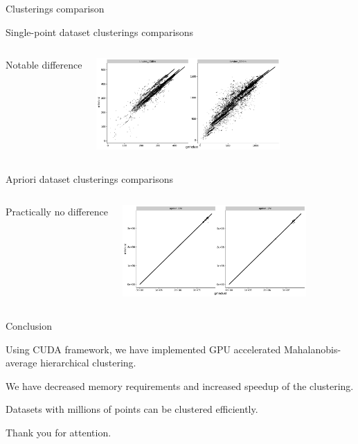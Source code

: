 \documentclass[10pt]{beamer}
\begin{document}
\begin{frame}{Clusterings comparison}
	
	\begin{block}{Single-point dataset clusterings comparisons}
		
		\begin{columns}
			\column{\linewidth-7cm}
			
			Notable difference
			
			\column{7cm}
			\includegraphics[width=7cm]{img/single_result}
			
		\end{columns}
	\end{block}

	\begin{block}{Apriori dataset clusterings comparisons}
		\begin{columns}
			\column{\linewidth-7cm}
			
			
			Practically no difference
			
			\column{7cm}
			\includegraphics[width=7cm]{../img/apriori_result}
			
		\end{columns}
	\end{block}
	
\end{frame}

\begin{frame}{Conclusion}
	
	Using CUDA framework, we have implemented GPU accelerated Mahalanobis-average hierarchical clustering.
	
	We have decreased memory requirements and increased speedup of the clustering.
	
	Datasets with millions of points can be clustered efficiently. 
	
\end{frame}

\begin{frame}[standout]
  Thank you for attention.

\end{frame}
\end{document}
